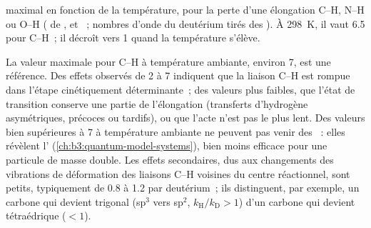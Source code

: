 \begin{omfigure}

{\small {} maximal en fonction de la
température, pour la perte d'une élongation C--H, N--H ou O--H
( de ,  et ~; nombres
d'onde du deutérium tirés des ). À \qty{298}{K}, il vaut
6.5 pour C--H~; il décroît vers 1 quand la température s'élève.}
\end{omfigure}

La valeur maximale pour C--H à température ambiante, environ 7, est une
référence. Des effets observés de 2 à 7 indiquent que la liaison C--H est
rompue dans l'étape cinétiquement déterminante~; des valeurs plus
faibles, que l'état de transition conserve une partie de l'élongation
(transferts d'hydrogène asymétriques, précoces ou tardifs), ou que l'acte
n'est pas le plus lent. Des valeurs bien supérieures à 7 à température
ambiante ne peuvent pas venir des ~: elles révèlent
l' (\cref{ch:b3:quantum-model-systems}), bien moins efficace
pour une particule de masse double. Les effets secondaires, dus aux
changements des vibrations de déformation des liaisons C--H voisines du
centre réactionnel, sont petits, typiquement de 0.8 à 1.2 par
deutérium~; ils distinguent, par exemple, un carbone qui devient trigonal
(sp$^3$ vers sp$^2$, $k_{\mathrm H}/k_{\mathrm D} > 1$) d'un carbone qui
devient tétraédrique ($< 1$).


